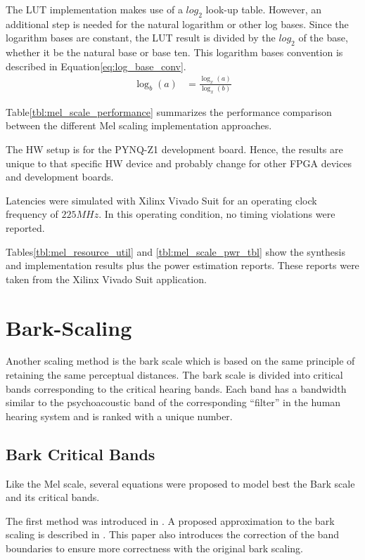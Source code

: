 The LUT implementation makes use of a \(log_{2}\) look-up table.
However, an additional step is 
needed for the natural logarithm or other log bases. 
Since the logarithm bases are constant, 
the LUT result is divided by the \(log_{2}\) of the base,
whether it be the natural base or base ten.
This logarithm bases 
convention is described in Equation\;\ref{eq:log_base_conv}.
\begin{align}\label{eq:log_base_conv}
    \log_{b}(a)  & = \frac{\log_{x}(a)}{\log_{x}(b)}
\end{align}


Table\;\ref{tbl:mel_scale_performance} summarizes
the performance comparison between the different Mel scaling
implementation approaches. 

The HW setup is for the PYNQ-Z1 development board.
Hence, the results are unique to that specific 
HW device and probably change for other 
FPGA devices and development boards.

Latencies were simulated with Xilinx Vivado Suit
for an operating clock frequency of \(225MHz\).
In this operating condition, no timing violations were reported.

Tables\;\ref{tbl:mel_resource_util} and \ref{tbl:mel_scale_pwr_tbl}
show the synthesis and implementation results 
plus the power estimation reports. 
These reports were taken from the Xilinx Vivado Suit application.

\section{Bark-Scaling}
Another scaling method is the bark scale which is based on
the same principle of retaining the same perceptual distances.
The bark scale is divided into critical 
bands corresponding to the critical hearing bands. 
Each band has a bandwidth similar 
to the psychoacoustic band of the corresponding 
``filter'' in the human hearing system 
and is ranked with a unique number.

\subsection{Bark Critical Bands}
Like the Mel scale, several equations were proposed to model best
the Bark scale and its critical bands.

The first method was introduced in \cite{doi:10.1121/1.1908630}.
A proposed approximation to the bark scaling is described in 
\cite{doi:10.1121/1.399849}. This paper also introduces the 
correction of the band boundaries to ensure more 
correctness with the original bark scaling.

